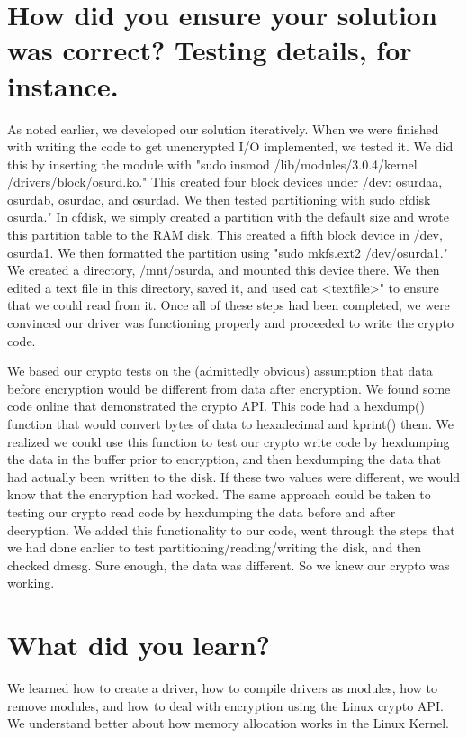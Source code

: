 \documentclass[10pt,draftclsnofoot,onecolumn,journal,compsoc]{IEEEtran}
\begin{document}
\section{How did you ensure your solution was correct? Testing details, for instance.}
As noted earlier, we developed our solution iteratively. When we were finished with writing the code to get unencrypted I/O implemented, we tested it. We did this by inserting the module with "sudo insmod /lib/modules/3.0.4/kernel
/drivers/block/osurd.ko." This created four block devices under /dev: osurdaa, osurdab, osurdac, and osurdad. We then tested partitioning with sudo cfdisk osurda." In cfdisk, we simply created a partition with the default size and wrote this partition table to the RAM disk. This created a fifth block device in /dev, osurda1. We then formatted the partition using "sudo mkfs.ext2 /dev/osurda1." We created a directory, /mnt/osurda, and mounted this device there. We then edited a text file in this directory, saved it, and used cat <textfile>" to ensure that we could read from it. Once all of these steps had been completed, we were convinced our driver was functioning properly and proceeded to write the crypto code.

We based our crypto tests on the (admittedly obvious) assumption that data before encryption would be different from data after encryption. We found some code online that demonstrated the crypto API. This code had a hexdump() function that would convert bytes of data to hexadecimal and kprint() them. We realized we could use this function to test our crypto write code by hexdumping the data in the buffer prior to encryption, and then hexdumping the data that had actually been written to the disk. If these two values were different, we would know that the encryption had worked. The same approach could be taken to testing our crypto read code by hexdumping the data before and after decryption. We added this functionality to our code, went through the steps that we had done earlier to test partitioning/reading/writing the disk, and then checked dmesg. Sure enough, the data was different. So we knew our crypto was working.

\section{What did you learn?}
We learned how to create a driver, how to compile drivers as modules, how to remove modules, and how to deal with encryption using the Linux crypto API. We understand better about how memory allocation works in the Linux Kernel.



\newpage


\end{document}
